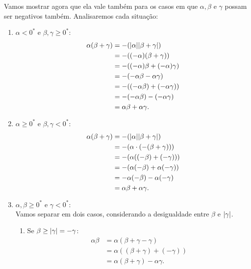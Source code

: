 \documentclass[../main.tex]{subfiles}
\begin{document}
\begin{dem}
    Vamos mostrar agora que ela vale também para os casos em que $\alpha, \beta$ e $\gamma$ possam ser negativos também. Analisaremos cada situação:
    \begin{enumerate}
        \item $\alpha < 0^*$ e $\beta, \gamma \geq 0^*$:
            \begin{align*}
                \alpha (\beta + \gamma) &= -(\abs{\alpha}\abs{\beta+\gamma}) \\
                &= -((-\alpha)(\beta+\gamma)) \\
                &= -((-\alpha)\beta + (-\alpha)\gamma) \\
                &= - (-\alpha\beta - \alpha\gamma)  \\
                &= - ((-\alpha\beta) + (-\alpha\gamma)) \\
                &= - (-\alpha\beta) - (-\alpha\gamma)  \\
                &= \alpha\beta + \alpha\gamma.
            \end{align*}
        \item $\alpha \geq 0^*$ e $\beta, \gamma < 0^*$:
            \begin{align*}
                \alpha(\beta+\gamma) &= -(\abs{\alpha}\abs{\beta+\gamma}) \\
                &= - (\alpha \cdot (-(\beta+\gamma))) \\
                &= -(\alpha((-\beta)+(-\gamma)))  \\
                &= -(\alpha(-\beta) + \alpha(-\gamma)) \\
                &=-\alpha(-\beta)-\alpha(-\gamma) \\
                &= \alpha\beta + \alpha\gamma.
            \end{align*}
        \item $\alpha,\beta \geq 0^*$ e $\gamma < 0^*$:\\
            Vamos separar em dois casos, considerando a desigualdade entre $\beta$ e $\abs{\gamma}$.
            \begin{enumerate}
                \item Se $\beta \geq \abs{\gamma} = -\gamma$:
                    \begin{align*}
                        \alpha\beta &= \alpha(\beta+\gamma-\gamma) \\
                        &= \alpha((\beta+\gamma)+(-\gamma)) \\
                        &= \alpha(\beta+\gamma) - \alpha\gamma.

\end{align*}
\end{enumerate}
\end{enumerate}
\end{dem}
\end{document}
